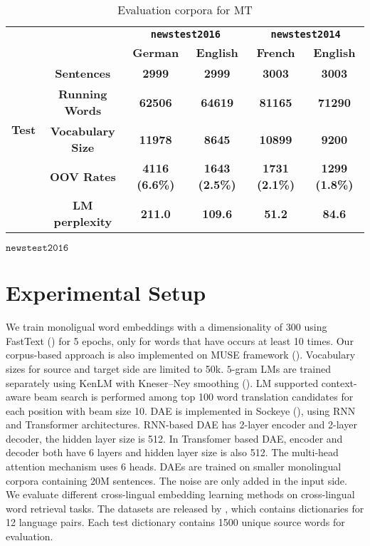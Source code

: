 \begin{table}[H]
	\centering
	
	\begin{tabular}{c|c|c|c|c|c}
		\hline
		\multirow{7}{*}{\textbf{Test}} & \textbf{}                      & \multicolumn{2}{c|}{\textbf{\texttt{newstest2016}}}    & \multicolumn{2}{c}{\textbf{\texttt{newstest2014}}}    \\ \cline{3-6} 
		& \multicolumn{1}{l|}{\textbf{}} & \textbf{German}       & \textbf{English}      & \textbf{French}       & \textbf{English}      \\ \cline{2-6} 
		& \textbf{Sentences}             & \textbf{2999}         & \textbf{2999}         & \textbf{3003}         & \textbf{3003}         \\ \cline{2-6} 
		& \textbf{Running Words}         & \textbf{62506}        & \textbf{64619}        & \textbf{81165}        & \textbf{71290}        \\ \cline{2-6} 
		& \textbf{Vocabulary Size}       & \textbf{11978}        & \textbf{8645}         & \textbf{10899}        & \textbf{9200}         \\ \cline{2-6} 
		& \textbf{OOV Rates}             & \textbf{4116 (6.6\%)} & \textbf{1643 (2.5\%)} & \textbf{1731 (2.1\%)} & \textbf{1299 (1.8\%)} \\ \cline{2-6} 
		& \textbf{LM perplexity}         & \textbf{211.0}        & \textbf{109.6}        & \textbf{51.2}         & \textbf{84.6}         \\ \hline
		
	\end{tabular}$\texttt{newstest2016}$
	\caption{Evaluation corpora for MT}
\end{table}

\section{Experimental Setup}
We train monoligual word embeddings with a dimensionality of 300 using FastText (\cite{DBLP:journals/corr/BojanowskiGJM16}) for 5 epochs, only for words that have occurs at least 10 times. Our corpus-based approach is also implemented on MUSE framework (\cite{DBLP:journals/corr/abs-1710-04087}). Vocabulary sizes for source and target side are limited to 50k.
$5$-gram LMs are trained separately using KenLM with Kneser–Ney smoothing (\cite{heafield2011kenlm}).
LM supported context-aware beam search is performed among top 100 word translation candidates for each position with beam size 10.
DAE is implemented in Sockeye (\cite{hieber2017sockeye}), using RNN and Transformer architectures. RNN-based DAE has 2-layer encoder and 2-layer decoder, the hidden layer size is 512. In Transfomer based DAE, encoder and decoder both have 6 layers and hidden layer size is also 512. The multi-head attention mechanism uses 6 heads. DAEs are trained on smaller monolingual corpora containing 20M sentences. The noise are only added in the input side. \\
We evaluate different cross-lingual embedding learning methods on cross-lingual word retrieval tasks. The datasets are released by \cite{}, which contains dictionaries for 12 language pairs. Each test dictionary contains 1500 unique source words for evaluation.  
